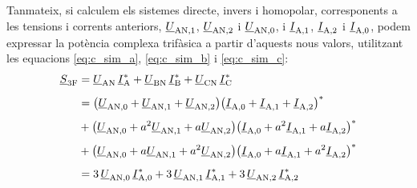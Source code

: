 Tanmateix, si calculem els sistemes directe, invers i homopolar,
corresponents a les tensions i corrents anteriors,
$\underline{U}_\mathrm{AN,1}$, $\underline{U}_\mathrm{AN,2}$ i
$\underline{U}_\mathrm{AN,0}$, i $\underline{I}_\mathrm{A,1}$,
$\underline{I}_\mathrm{A,2}$ i $\underline{I}_\mathrm{A,0}$, podem
expressar la potència complexa trifàsica a partir d'aquests nous
valors, utilitzant les equacions \eqref{eq:c_sim_a},
\eqref{eq:c_sim_b} i \eqref{eq:c_sim_c}:
\begin{equation}
\begin{split}
   \underline{S}_\mathrm{3F} &= \underline{U}_\mathrm{AN} \,\underline{I}_\mathrm{A}^* +
   \underline{U}_\mathrm{BN} \,\underline{I}_\mathrm{B}^* +  \underline{U}_\mathrm{CN} \,\underline{I}_\mathrm{C}^*  \\[1ex]
   &= \big(\underline{U}_\mathrm{AN,0} + \underline{U}_\mathrm{AN,1} +
   \underline{U}_\mathrm{AN,2}\big) \big(\underline{I}_\mathrm{A,0} + \underline{I}_\mathrm{A,1} +
   \underline{I}_\mathrm{A,2}\big)^*   \\[1ex]
   &+ \big(\underline{U}_\mathrm{AN,0} + a^2 \underline{U}_\mathrm{AN,1} +
   a \underline{U}_\mathrm{AN,2} \big) \big(\underline{I}_\mathrm{A,0} + a^2 \underline{I}_\mathrm{A,1}
    + a \underline{I}_\mathrm{A,2} \big)^*  \\[1ex]
   &+ \big(\underline{U}_\mathrm{AN,0} + a \underline{U}_\mathrm{AN,1} + a^2
   \underline{U}_\mathrm{AN,2} \big) \big(\underline{I}_\mathrm{A,0} + a
   \underline{I}_\mathrm{A,1} + a^2 \underline{I}_\mathrm{A,2} \big)^*   \\[1ex]
   &= 3\, \underline{U}_\mathrm{AN,0} \, \underline{I}_\mathrm{A,0}^* +
      3\, \underline{U}_\mathrm{AN,1} \, \underline{I}_\mathrm{A,1}^* +
      3\, \underline{U}_\mathrm{AN,2}\,  \underline{I}_\mathrm{A,2}^*
    \label{eq:c_sim_s}
\end{split}
\end{equation}



